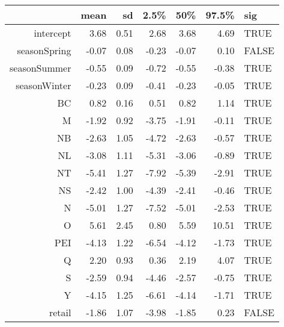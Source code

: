 \begin{table}[ht]
\centering
\begin{tabular}{rrrrrrl}
  \hline
 & mean & sd & 2.5\% & 50\% & 97.5\% & sig \\ 
  \hline
intercept & 3.68 & 0.51 & 2.68 & 3.68 & 4.69 & TRUE \\ 
  seasonSpring & -0.07 & 0.08 & -0.23 & -0.07 & 0.10 & FALSE \\ 
  seasonSummer & -0.55 & 0.09 & -0.72 & -0.55 & -0.38 & TRUE \\ 
  seasonWinter & -0.23 & 0.09 & -0.41 & -0.23 & -0.05 & TRUE \\ 
  BC & 0.82 & 0.16 & 0.51 & 0.82 & 1.14 & TRUE \\ 
  M & -1.92 & 0.92 & -3.75 & -1.91 & -0.11 & TRUE \\ 
  NB & -2.63 & 1.05 & -4.72 & -2.63 & -0.57 & TRUE \\ 
  NL & -3.08 & 1.11 & -5.31 & -3.06 & -0.89 & TRUE \\ 
  NT & -5.41 & 1.27 & -7.92 & -5.39 & -2.91 & TRUE \\ 
  NS & -2.42 & 1.00 & -4.39 & -2.41 & -0.46 & TRUE \\ 
  N & -5.01 & 1.27 & -7.52 & -5.01 & -2.53 & TRUE \\ 
  O & 5.61 & 2.45 & 0.80 & 5.59 & 10.51 & TRUE \\ 
  PEI & -4.13 & 1.22 & -6.54 & -4.12 & -1.73 & TRUE \\ 
  Q & 2.20 & 0.93 & 0.36 & 2.19 & 4.07 & TRUE \\ 
  S & -2.59 & 0.94 & -4.46 & -2.57 & -0.75 & TRUE \\ 
  Y & -4.15 & 1.25 & -6.61 & -4.14 & -1.71 & TRUE \\ 
  retail & -1.86 & 1.07 & -3.98 & -1.85 & 0.23 & FALSE \\ 
   \hline
\end{tabular}
\end{table}
